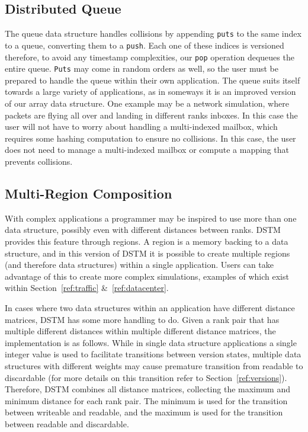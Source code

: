 \subsection{Distributed Queue}
The queue data structure handles collisions by appending \texttt{puts} to the same index to a queue, converting them to a \texttt{push}. Each one of these indices is versioned therefore, to avoid any timestamp complexities, our \texttt{pop} operation dequeues the entire queue. \texttt{Puts} may come in random orders as well, so the user must be prepared to handle the queue within their own application. The queue suits itself towards a large variety of applications, as in someways it is an improved version of our array data structure. One example may be a network simulation, where packets are flying all over and landing in different ranks inboxes. In this case the user will not have to worry about handling a multi-indexed mailbox, which requires some hashing computation to ensure no collisions. In this case, the user does not need to manage a multi-indexed mailbox
or compute a mapping that prevents collisions.

\subsection{Multi-Region Composition}
With complex applications a programmer may be inspired to use more than one data structure, possibly even with different distances between ranks. DSTM provides this feature through regions. A region is a memory backing to a data structure, and in this version of DSTM it is possible to create multiple regions (and therefore data structures) within a single application. Users can take advantage of this to create more complex simulations, examples of which exist within Section~\ref{ref:traffic} \&~\ref{ref:datacenter}.

In cases where two data structures within an application have different distance matrices, DSTM has some more handling to do. Given a rank pair that has multiple different distances within multiple different distance matrices, the implementation is as follows. While in single data structure applications a single integer value is used to facilitate transitions between version states, multiple data structures with different weights may cause premature transition from readable to discardable (for more details on this transition refer to Section~\ref{ref:versions}). Therefore, DSTM combines all distance matrices, collecting the maximum and minimum distance for each rank pair. The minimum is used for the transition between writeable and readable, and the maximum is used for the transition between readable and discardable.

